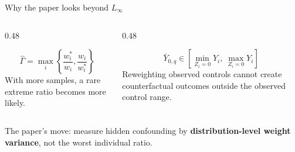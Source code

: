 \documentclass[aspectratio=169,10pt]{ctexbeamer}
\begin{document}
\begin{frame}{Why the paper looks beyond $L_\infty$}
  \begin{columns}[T,totalwidth=\textwidth]
    \begin{column}{0.48\textwidth}
      \begin{redbox}[title=Problem 1: ratio-driven]
        \[
          \widehat{\Gamma}
          =
          \max_i
          \left\{
          \frac{w_i^*}{w_i},
          \frac{w_i}{w_i^*}
          \right\}
        \]
        \small With more samples, a rare extreme ratio becomes more likely.
      \end{redbox}
    \end{column}
    \begin{column}{0.48\textwidth}
      \begin{redbox}[title=Problem 2: sample-bounded]
        \[
          \bar Y_{0,q}
          \in
          [\min_{Z_i=0}Y_i,\ \max_{Z_i=0}Y_i]
        \]
        \small Reweighting observed controls cannot create counterfactual outcomes outside the observed control range.
      \end{redbox}
    \end{column}
  \end{columns}
  \vspace{0.55cm}
  \begin{yellowbox}
    \centering
    The paper's move: measure hidden confounding by \textbf{distribution-level weight variance}, not the worst individual ratio.
  \end{yellowbox}
\end{frame}
\end{document}
